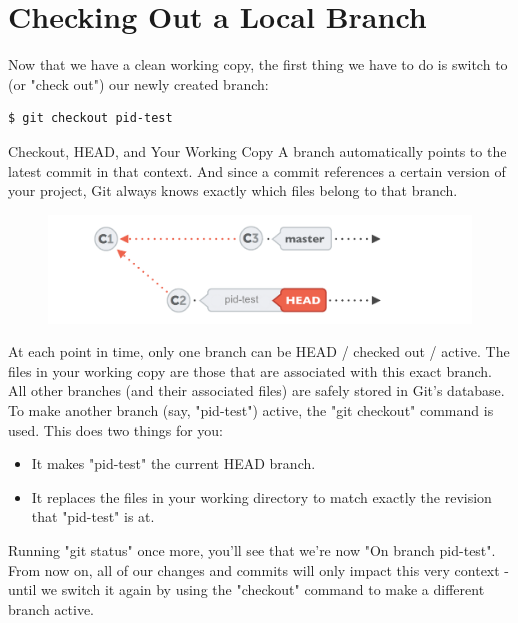 \documentclass{article}
\begin{document}
\section{Checking Out a Local Branch}
Now that we have a clean working copy, the first thing we have to do is switch to (or "check out") our newly created branch:
\begin{lstlisting}[language=bash]
$ git checkout pid-test
\end{lstlisting}

\begin{concept}
Checkout, HEAD, and Your Working Copy
\newline\newline
A branch automatically points to the latest commit in that context. And since a commit references a certain version of your project, Git always knows exactly which files belong to that branch.
\begin{figure}[h]
    \centering
    \includegraphics[width=4.5in]{images/branch-pointers.png}
\end{figure}
At each point in time, only one branch can be HEAD / checked out / active. The files in your working copy are those that are associated with this exact branch. All other branches (and their associated files) are safely stored in Git's database.
\newline\newline
To make another branch (say, "pid-test") active, the "git checkout" command is used. This does two things for you:
\begin{itemize}
    \item It makes "pid-test" the current HEAD branch.
    \item It replaces the files in your working directory to match exactly the revision that "pid-test" is at.
\end{itemize}
\end{concept}
Running "git status" once more, you'll see that we're now "On branch pid-test". From now on, all of our changes and commits will only impact this very context - until we switch it again by using the "checkout" command to make a different branch active.
\newline\newline
\end{document}
